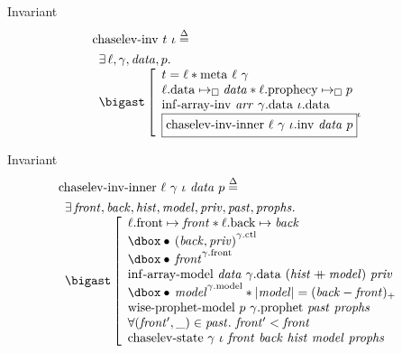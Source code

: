 \begin{frame}{Invariant}
\begin{align*}
		&\mathrm{chaselev \mathhyphen inv}\ t\ \iota
		\eqdef
	\\
		&\begin{array}{l}
				\exists \ell, \gamma, \mathit{data}, p .\ 
			\\
				\iBigsep\left[\begin{array}{l}
						t = \ell \iSep
						\mathrm{meta}\ \ell\ \gamma
					\\
						\ell\mathrm{.data} \mapsto_\square \mathit{data} \iSep
						\ell\mathrm{.prophecy} \mapsto_\square p
					\\
						\mathrm{inf \mathhyphen array \mathhyphen inv}\ \mathit{arr}\ \gamma\mathrm{.data}\ \iota\mathrm{.data}
					\\
						\iInv{\iota}{\mathrm{chaselev \mathhyphen inv \mathhyphen inner}\ \ell\ \gamma\ \iota\mathrm{.inv}\ \mathit{data}\ p}
				\end{array}\right.
		\end{array}
\end{align*}
\end{frame}


\begin{frame}{Invariant}
\begin{align*}
		&\mathrm{chaselev \mathhyphen inv \mathhyphen inner}\ \ell\ \gamma\ \iota\ \mathit{data}\ p
		\eqdef
	\\
		&\begin{array}{l}
				\exists \mathit{front}, \mathit{back}, \mathit{hist}, \mathit{model}, \mathit{priv}, \mathit{past}, \mathit{prophs} .\ 
			\\
				\iBigsep\left[\begin{array}{l}
						\ell\mathrm{.front} \mapsto \mathit{front} \iSep
						\ell\mathrm{.back} \mapsto \mathit{back}
					\\
						\iGhost{\gamma\mathrm{.ctl}}{\iAuth{(\mathit{back}, \mathit{priv})}}
					\\
						\iGhost{\gamma\mathrm{.front}}{\iAuth{\mathit{front}}}
					\\
						\mathrm{inf \mathhyphen array \mathhyphen model}\ \mathit{data}\ \gamma\mathrm{.data}\ (\mathit{hist} \mdoubleplus \mathit{model})\ \mathit{priv}
					\\
						\iGhost{\gamma\mathrm{.model}}{\iAuth{\mathit{model}}} \iSep
						| \mathit{model} | = (\mathit{back} - \mathit{front})_+
					\\
						\mathrm{wise \mathhyphen prophet \mathhyphen model}\ p\ \gamma\mathrm{.prophet}\ \mathit{past}\ \mathit{prophs}
					\\
						\forall (\mathit{front'}, \_) \in \mathit{past} .\ \mathit{front'} < \mathit{front}
					\\
						\mathrm{chaselev \mathhyphen state}\ \gamma\ \iota\ \mathit{front}\ \mathit{back}\ \mathit{hist}\ \mathit{model}\ \mathit{prophs}
				\end{array}\right.
		\end{array}
\end{align*}
\end{frame}